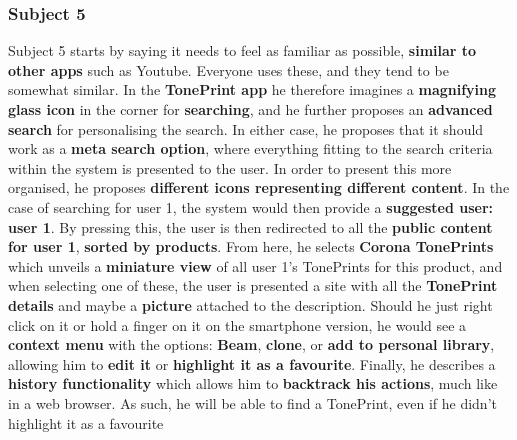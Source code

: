 \subsubsection{Subject 5}
\label{Subject5}
Subject 5 starts by saying it needs to feel as familiar as possible, \textbf{similar to other apps} such as Youtube. Everyone uses these, and they tend to be somewhat similar. In the \textbf{TonePrint app} he therefore imagines a \textbf{magnifying glass icon} in the corner for \textbf{searching}, and he further proposes an \textbf{advanced search} for personalising the search. In either case, he proposes that it should work as a \textbf{meta search option}, where everything fitting to the search criteria within the system is presented to the user. In order to present this more organised, he proposes \textbf{different icons representing different content}. In the case of searching for user 1, the system would then provide a \textbf{suggested user: user 1}. By pressing this, the user is then redirected to all the \textbf{public content for user 1}, \textbf{sorted by products}. From here, he selects \textbf{Corona TonePrints} which unveils a \textbf{miniature view} of all user 1's TonePrints for this product, and when selecting one of these, the user is presented a site with all the \textbf{TonePrint details} and maybe a \textbf{picture} attached to the description. Should he just right click on it or hold a finger on it on the smartphone version, he would see a \textbf{context menu} with the options: \textbf{Beam}, \textbf{clone}, or \textbf{add to personal library}, allowing him to \textbf{edit it} or \textbf{highlight it as a favourite}. Finally, he describes a \textbf{history functionality} which allows him to \textbf{backtrack his actions}, much like in a web browser. As such, he will be able to find a TonePrint, even if he didn't highlight it as a favourite \\
%
